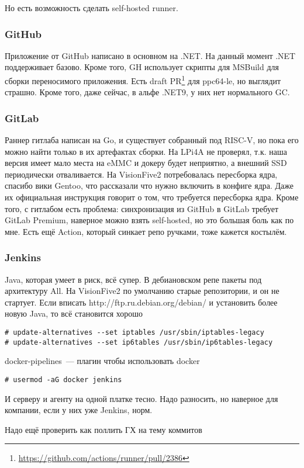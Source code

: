 Но есть возможность сделать self-hosted runner.

\subsubsection{GitHub}

Приложение от GitHub написано в основном на .NET.
На данный момент .NET поддерживает \riscv{} базово.
Кроме того, GH использует скрипты для MSBuild для сборки переносимого приложения.
Есть draft PR\footnote{
	\url{https://github.com/actions/runner/pull/2386}
} для ppc64-le, но выглядит страшно.
Кроме того, даже сейчас, в альфе .NET9, у них нет нормального GC.

\subsubsection{GitLab}

Раннер гитлаба написан на Go, и существует собранный под RISC-V, но пока его можно найти только в их артефактах сборки.
На LPi4A не проверял, т.к. наша версия имеет мало места на eMMC и докеру будет неприятно, а внешний SSD периодически отваливается.
На VisionFive2 потребовалась пересборка ядра, спасибо вики Gentoo, что рассказали что нужно включить в конфиге ядра.
Даже их официальная инструкция говорит о том, что требуется пересборка ядра.
Кроме того, с гитлабом есть проблема: синхронизация из GitHub в GitLab требует GitLab Premium, наверное можно взять self-hosted, но это большая боль как по мне.
Есть ещё Action, который синкает репо ручками, тоже кажется костылём.

\subsubsection{Jenkins}
Java, которая умеет в риск, всё супер. В дебиановском репе пакеты под архитектуру All. На VisionFive2 по умолчанию старые репозитории, и он не стартует. Если вписать http://ftp.ru.debian.org/debian/ и установить более новую Java, то всё становится хорошо
\begin{verbatim}
# update-alternatives --set iptables /usr/sbin/iptables-legacy
# update-alternatives --set ip6tables /usr/sbin/ip6tables-legacy
\end{verbatim}

docker-pipelines~--- плагин чтобы использовать docker
\begin{verbatim}
# usermod -aG docker jenkins
\end{verbatim}

И серверу и агенту на одной платке тесно.
Надо разносить, но наверное для компании, если у них уже Jenkins, норм.

Надо ещё проверить как поллить ГХ на тему коммитов
